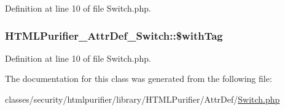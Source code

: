 Definition at line 10 of file Switch.\+php.

\hypertarget{classHTMLPurifier__AttrDef__Switch_a2b3eddccdafb76e7280bd4e877653f68}{
\subsubsection[{\$with\+Tag}]{\setlength{\rightskip}{0pt plus 5cm}H\+T\+M\+L\+Purifier\+\_\+\+Attr\+Def\+\_\+\+Switch\+::\$with\+Tag\hspace{0.3cm}{\ttfamily [protected]}}}\label{classHTMLPurifier__AttrDef__Switch_a2b3eddccdafb76e7280bd4e877653f68}


Definition at line 10 of file Switch.\+php.



The documentation for this class was generated from the following file\+:\begin{DoxyCompactItemize}
\item 
classes/security/htmlpurifier/library/\+H\+T\+M\+L\+Purifier/\+Attr\+Def/\hyperlink{Switch_8php}{Switch.\+php}\end{DoxyCompactItemize}
